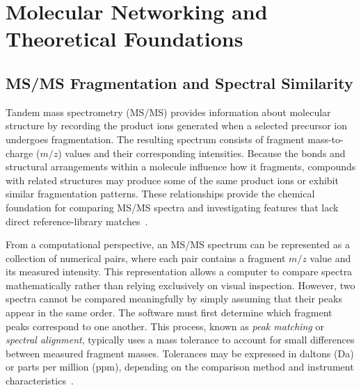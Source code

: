 \section{Molecular Networking and Theoretical Foundations}\label{sec:molecular-networking}

    \subsection{MS/MS Fragmentation and Spectral Similarity}\label{subsec:fragmentation-similarity}


        Tandem mass spectrometry (MS/MS) provides information about molecular structure by recording the product ions generated when a selected precursor ion undergoes fragmentation. The resulting spectrum consists of fragment mass-to-charge ($m/z$) values and their corresponding intensities. Because the bonds and structural arrangements within a molecule influence how it fragments, compounds with related structures may produce some of the same product ions or exhibit similar fragmentation patterns. These relationships provide the chemical foundation for comparing MS/MS spectra and investigating features that lack direct reference-library matches~\cite{Wang2016,Bittremieux2022}.

        From a computational perspective, an MS/MS spectrum can be represented as a collection of numerical pairs, where each pair contains a fragment $m/z$ value and its measured intensity. This representation allows a computer to compare spectra mathematically rather than relying exclusively on visual inspection. However, two spectra cannot be compared meaningfully by simply assuming that their peaks appear in the same order. The software must first determine which fragment peaks correspond to one another. This process, known as \emph{peak matching} or \emph{spectral alignment}, typically uses a mass tolerance to account for small differences between measured fragment masses. Tolerances may be expressed in daltons (Da) or parts per million (ppm), depending on the comparison method and instrument characteristics~\cite{Bittremieux2022}.

